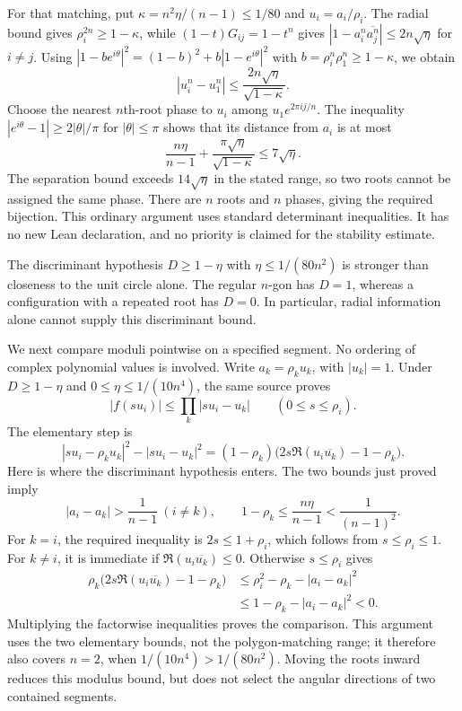 \documentclass[11pt]{article}
\begin{document}
For that matching, put $\kappa=n^2\eta/(n-1)\le1/80$ and
$u_i=a_i/\rho_i$. The radial bound gives
$\rho_i^{2n}\ge1-\kappa$, while
$(1-t)G_{ij}=1-t^n$ gives
$|1-a_i^n\overline{a_j^n}|\le2n\sqrt\eta$ for $i\ne j$.
Using
$|1-be^{i\theta}|^2=(1-b)^2+b|1-e^{i\theta}|^2$ with
$b=\rho_i^n\rho_1^n\ge1-\kappa$, we obtain
\[
 |u_i^n-u_1^n|\le\frac{2n\sqrt\eta}{\sqrt{1-\kappa}}.
\]
Choose the nearest $n$th-root phase to $u_i$ among
$u_1e^{2\pi i j/n}$. The inequality
$|e^{i\theta}-1|\ge2|\theta|/\pi$ for $|\theta|\le\pi$
shows that its distance from $a_i$ is at most
\[
 \frac{n\eta}{n-1}+\frac{\pi\sqrt\eta}{\sqrt{1-\kappa}}
 \le7\sqrt\eta.
\]
The separation bound exceeds $14\sqrt\eta$ in the stated range,
so two roots cannot be assigned the same phase. There are $n$ roots and
$n$ phases, giving the required bijection. This ordinary argument uses standard determinant inequalities.
It has no new Lean declaration, and no priority is claimed for the
stability estimate.

The discriminant hypothesis $D\ge1-\eta$ with $\eta\le1/(80n^2)$
is stronger than closeness to the unit circle alone. The regular $n$-gon has $D=1$, whereas a configuration with
a repeated root has $D=0$. In particular, radial information alone cannot
supply this discriminant bound.

We next compare moduli pointwise on a specified segment. No ordering
of complex polynomial values is involved. Write
$a_k=\rho_k u_k$, with $|u_k|=1$. Under
$D\ge1-\eta$ and $0\le\eta\le1/(10n^4)$, the same source proves
\[
 |f(su_i)|\le\prod_k|su_i-u_k|
 \qquad(0\le s\le\rho_i).
\]
The elementary step is
\[
 |su_i-\rho_ku_k|^2-|su_i-u_k|^2
 =(1-\rho_k)\bigl(2s\Re(u_i\overline{u_k})-1-\rho_k\bigr).
\]
Here is where the discriminant hypothesis enters. The two bounds just
proved imply
\[
 |a_i-a_k|>\frac1{n-1}\ (i\ne k),\qquad
 1-\rho_k\le\frac{n\eta}{n-1}<\frac1{(n-1)^2}.
\]
For $k=i$, the required inequality is $2s\le1+\rho_i$, which follows
from $s\le\rho_i\le1$. For $k\ne i$, it is immediate if
$\Re(u_i\overline{u_k})\le0$. Otherwise $s\le\rho_i$ gives
\[
\begin{split}
 \rho_k\bigl(2s\Re(u_i\overline{u_k})-1-\rho_k\bigr)
 &\le\rho_i^2-\rho_k-|a_i-a_k|^2\\
 &\le1-\rho_k-|a_i-a_k|^2<0.
\end{split}
\]
Multiplying the factorwise inequalities proves the comparison. This
argument uses the two elementary bounds, not the polygon-matching range;
it therefore also covers $n=2$, when $1/(10n^4)>1/(80n^2)$.
Moving the roots inward reduces this modulus bound, but does not select
the angular directions of two contained segments.
\end{document}
